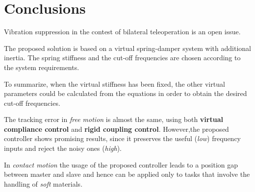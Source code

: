 \newpage

\section{Conclusions}
Vibration suppression in the contest of bilateral teleoperation is an open
issue.
\bigskip

The proposed solution is based on a virtual spring-damper system with additional
inertia. The spring stiffness and the cut-off frequencies are chosen according to the system requirements.
\bigskip

To summarize, when the virtual stiffness has been fixed, the other virtual
parameters could be calculated from the equations in order to obtain the desired
cut-off frequencies.
\bigskip

The tracking error in \textit{free motion} is almost the same, using both \textbf{virtual compliance control} and \textbf{rigid coupling control}. However,the proposed controller shows promising results, since it preserves the useful (\textsl{low}) frequency inputs and reject the noisy ones (\textsl{high}). 
\bigskip

In \textit{contact motion} the usage of the proposed controller leads to a position gap between master and slave and hence can be applied only to tasks that involve the handling of \textsl{soft} materials.



